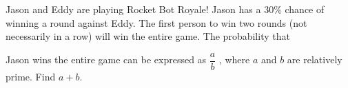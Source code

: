 Jason and Eddy are playing Rocket Bot Royale! Jason has a $30\%$ chance of winning a round against Eddy. The first person to win two rounds (not necessarily in a row) will win the entire game. The probability that

Jason wins the entire game can be expressed as $\dfrac{a}{b}$ , where $a$ and $b$ are relatively prime. Find $a + b$.
